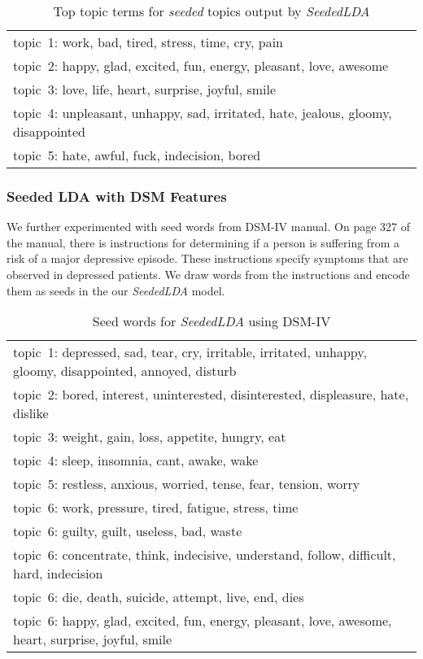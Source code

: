 \begin{table*} [ht!]
	\begin{tabular}{ l }
	\hline
{topic~1: work, bad, tired, stress, time, cry, pain}\\
{topic~2: happy, glad, excited, fun, energy, pleasant, love, awesome}\\
{topic~3: love, life, heart, surprise, joyful, smile}\\
{topic~4: unpleasant, unhappy, sad, irritated, hate, jealous, gloomy, disappointed }\\
{topic~5: hate, awful, fuck, indecision, bored}\\
\hline
    \end{tabular}
      \caption{\noindent Top topic terms for \textit{seeded} topics output by \textit{SeededLDA}}
        \label{table:seedwords_1}
\end{table*}

\subsubsection{Seeded LDA with DSM Features}

We further experimented with seed words from DSM-IV manual. On page 327 of the manual, there is instructions for determining if a person is suffering from a risk of a major depressive episode. These instructions specify symptoms that are observed in depressed patients. We draw words from the instructions and encode them as seeds in the our \textit{SeededLDA} model.

\begin{table*} [ht!]
	\begin{tabular}{ l }
	\hline
{topic~1: depressed, sad, tear, cry, irritable, irritated, unhappy, gloomy, disappointed, annoyed, disturb}\\
{topic~2: bored, interest, uninterested, disinterested, displeasure, hate, dislike}\\
{topic~3: weight, gain, loss, appetite, hungry, eat}\\
{topic~4: sleep, insomnia, cant, awake, wake }\\
{topic~5: restless, anxious, worried, tense, fear, tension, worry}\\
{topic~6: work, pressure, tired, fatigue, stress, time}\\
{topic~6: guilty, guilt, useless, bad, waste}\\
{topic~6: concentrate, think, indecisive, understand, follow, difficult, hard, indecision}\\
{topic~6: die, death, suicide, attempt, live, end, dies}\\
{topic~6: happy, glad, excited, fun, energy, pleasant, love, awesome, heart, surprise, joyful, smile}\\
\hline
    \end{tabular}
      \caption{\noindent Seed words for \textit{SeededLDA} using DSM-IV}
        \label{table:seedwords_1}
\end{table*}

